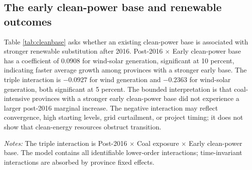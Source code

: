 \documentclass[11pt]{article}
\newcommand{\note}[1]{\begin{minipage}{0.96\textwidth}\footnotesize\textit{Notes:} #1\end{minipage}}
\begin{document}
\subsection{The early clean-power base and renewable outcomes}

Table \ref{tab:cleanbase} asks whether an existing clean-power base is associated with stronger renewable substitution after 2016. Post-2016 $\times$ Early clean-power base has a coefficient of $0.0908$ for wind-solar generation, significant at 10 percent, indicating faster average growth among provinces with a stronger early base. The triple interaction is $-0.0927$ for wind generation and $-0.2363$ for wind-solar generation, both significant at 5 percent. The bounded interpretation is that coal-intensive provinces with a stronger early clean-power base did not experience a larger post-2016 marginal increase. The negative interaction may reflect convergence, high starting levels, grid curtailment, or project timing; it does not show that clean-energy resources obstruct transition.

\begin{table}[H]
\centering
\caption{Early clean-power base and post-2016 renewable outcomes}
\label{tab:cleanbase}
\note{The triple interaction is Post-2016 $\times$ Coal exposure $\times$ Early clean-power base. The model contains all identifiable lower-order interactions; time-invariant interactions are absorbed by province fixed effects.}
\end{table}
\end{document}
